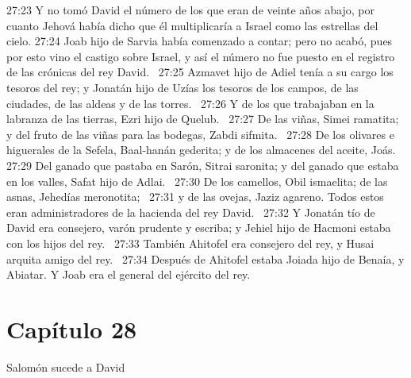 27:23 Y no tomó David el número de los que eran de veinte años abajo, por cuanto Jehová había dicho que él multiplicaría a Israel como las estrellas del cielo. 
27:24 Joab hijo de Sarvia había comenzado a contar; pero no acabó, pues por esto vino el castigo sobre Israel, y así el número no fue puesto en el registro de las crónicas del rey David.  
27:25 Azmavet hijo de Adiel tenía a su cargo los tesoros del rey; y Jonatán hijo de Uzías los tesoros de los campos, de las ciudades, de las aldeas y de las torres.  
27:26 Y de los que trabajaban en la labranza de las tierras, Ezri hijo de Quelub.  
27:27 De las viñas, Simei ramatita; y del fruto de las viñas para las bodegas, Zabdi sifmita.  
27:28 De los olivares e higuerales de la Sefela, Baal-hanán gederita; y de los almacenes del aceite, Joás.  
27:29 Del ganado que pastaba en Sarón, Sitrai saronita; y del ganado que estaba en los valles, Safat hijo de Adlai.  
27:30 De los camellos, Obil ismaelita; de las asnas, Jehedías meronotita;  
27:31 y de las ovejas, Jaziz agareno. Todos estos eran administradores de la hacienda del rey David.  
27:32 Y Jonatán tío de David era consejero, varón prudente y escriba; y Jehiel hijo de Hacmoni estaba con los hijos del rey.  
27:33 También Ahitofel era consejero del rey, y Husai arquita amigo del rey.  
27:34 Después de Ahitofel estaba Joiada hijo de Benaía, y Abiatar. Y Joab era el general del ejército del rey.  
\section*{Capítulo 28}
Salomón sucede a David  

